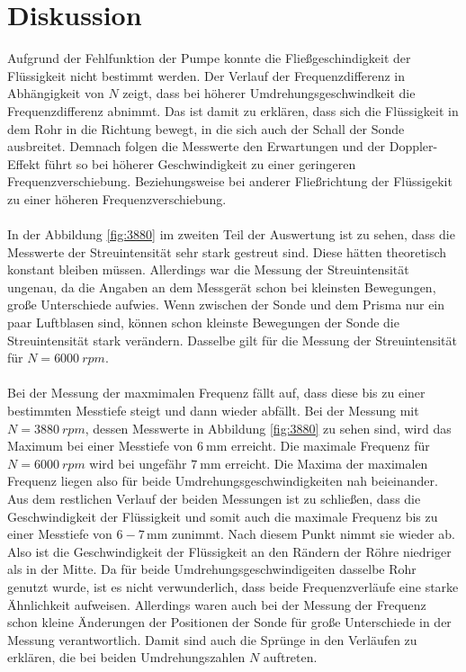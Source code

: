 \section{Diskussion}
\label{sec:Diskussion}

Aufgrund der Fehlfunktion der Pumpe konnte die Fließgeschindigkeit der Flüssigkeit nicht bestimmt werden.
Der Verlauf der Frequenzdifferenz in Abhängigkeit von $N$ zeigt, dass bei höherer Umdrehungsgeschwindkeit die Frequenzdifferenz abnimmt.
Das ist damit zu erklären, dass sich die Flüssigkeit in dem Rohr in die Richtung bewegt, in die sich auch der Schall der Sonde ausbreitet.
Demnach folgen die Messwerte den Erwartungen und der Doppler-Effekt führt so bei höherer Geschwindigkeit zu einer geringeren Frequenzverschiebung.
Beziehungsweise bei anderer Fließrichtung der Flüssigekit zu einer höheren Frequenzverschiebung.
\\\\
In der Abbildung \ref{fig:3880} im zweiten Teil der Auswertung ist zu sehen, dass die Messwerte der Streuintensität sehr stark gestreut sind.
Diese hätten theoretisch konstant bleiben müssen.
Allerdings war die Messung der Streuintensität ungenau, da die Angaben an dem Messgerät schon bei kleinsten Bewegungen, große Unterschiede aufwies.
Wenn zwischen der Sonde und dem Prisma nur ein paar Luftblasen sind, können schon kleinste Bewegungen der Sonde die Streuintensität stark verändern.
Dasselbe gilt für die Messung der Streuintensität für $N=\SI{6000}{rpm}$.
\\\\
Bei der Messung der maxmimalen Frequenz fällt auf, dass diese bis zu einer bestimmten Messtiefe steigt und dann wieder abfällt.
Bei der Messung mit $N=\SI{3880}{rpm}$, dessen Messwerte in Abbildung \ref{fig:3880} zu sehen sind, wird das Maximum bei einer Messtiefe von $\SI{6}{\milli\meter}$ erreicht.
Die maximale Frequenz für $N=\SI{6000}{rpm}$ wird bei ungefähr $\SI{7}{\milli\meter}$ erreicht.
Die Maxima der maximalen Frequenz liegen also für beide Umdrehungsgeschwindigkeiten nah beieinander.
Aus dem restlichen Verlauf der beiden Messungen ist zu schließen, dass die Geschwindigkeit der Flüssigkeit und somit auch die maximale Frequenz bis zu einer Messtiefe von $6-7 \,\si{\milli\meter}$ zunimmt.
Nach diesem Punkt nimmt sie wieder ab.
Also ist die Geschwindigkeit der Flüssigkeit an den Rändern der Röhre niedriger als in der Mitte.
Da für beide Umdrehungsgeschwindigeiten dasselbe Rohr genutzt wurde, ist es nicht verwunderlich, dass beide Frequenzverläufe eine starke Ähnlichkeit aufweisen.
Allerdings waren auch bei der Messung der Frequenz schon kleine Änderungen der Positionen der Sonde für große Unterschiede in der Messung verantwortlich.
Damit sind auch die Sprünge in den Verläufen zu erklären, die bei beiden Umdrehungszahlen $N$ auftreten.